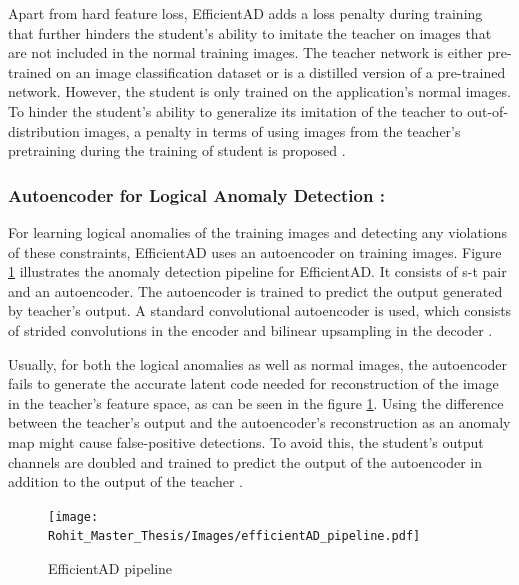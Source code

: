 Apart from hard feature loss, EfficientAD adds a loss penalty during training that further hinders the student's ability to imitate the teacher on images that are not included in the normal training images. The teacher network is either pre-trained on an image classification dataset or is a distilled version of a pre-trained network. However, the student is only trained on the application's normal images. To hinder the student's ability to generalize its imitation of the teacher to out-of-distribution images, a penalty in terms of using images from the teacher's pretraining during the training of student is proposed \cite{batzner2024efficientadaccuratevisualanomaly}.

\subsubsection*{Autoencoder for Logical Anomaly Detection :}

For learning logical anomalies of the training images and detecting any violations of these constraints, EfficientAD uses an autoencoder on training images. Figure \ref{fig:EfficientAD pipeline} illustrates the anomaly detection pipeline for EfficientAD. It consists of \gls{s-t} pair and an autoencoder. The autoencoder is trained to predict the output generated by teacher's output. A standard convolutional autoencoder is used, which consists of strided convolutions in the encoder and bilinear upsampling in the decoder \cite{batzner2024efficientadaccuratevisualanomaly}.

Usually, for both the logical anomalies as well as normal images, the autoencoder fails to generate the accurate latent code needed for reconstruction of the image in the teacher's feature space, as can be seen in the figure \ref{fig:EfficientAD pipeline}. Using the difference between the teacher's output and the autoencoder's reconstruction as an anomaly map might cause false-positive detections. To avoid this, the student's output channels are doubled and trained to predict the output of the autoencoder in addition to the output of the teacher \cite{batzner2024efficientadaccuratevisualanomaly}.

\begin{figure}[ht!]
    \centering
    \texttt{[image: Rohit\_Master\_Thesis/Images/efficientAD\_pipeline.pdf]}
    \caption{EfficientAD pipeline}
    \label{fig:EfficientAD pipeline}
\end{figure}

